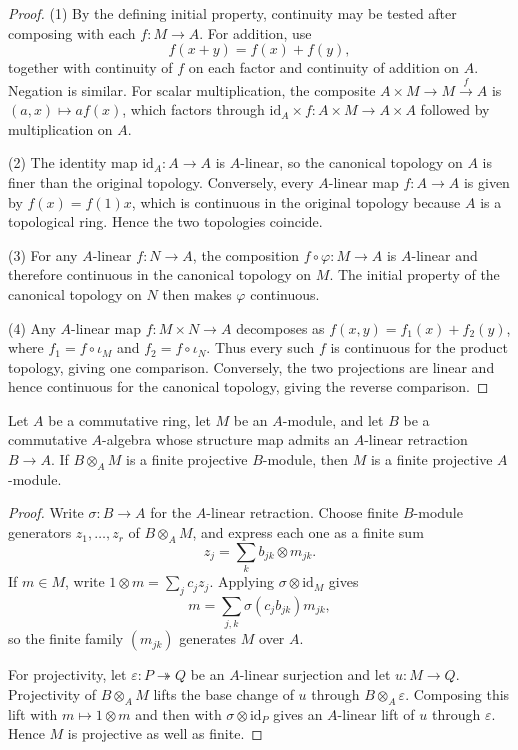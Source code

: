 \begin{proof}
  \leanok
  (1) By the defining initial property, continuity may be tested after
  composing with each $f\colon M\to A$.  For addition, use
  \[
    f(x+y)=f(x)+f(y),
  \]
  together with continuity of $f$ on each factor and continuity of addition
  on $A$.  Negation is similar.  For scalar multiplication, the composite
  $A\times M\to M\xrightarrow{f}A$ is
  $(a,x)\mapsto a f(x)$, which factors through
  $\mathrm{id}_A\times f\colon A\times M\to A\times A$ followed by
  multiplication on $A$.

  (2) The identity map $\mathrm{id}_A\colon A\to A$ is $A$-linear, so the
  canonical topology on $A$ is finer than the original topology.  Conversely,
  every $A$-linear map $f\colon A\to A$ is given by $f(x)=f(1)x$, which is
  continuous in the original topology because $A$ is a topological ring.
  Hence the two topologies coincide.

  (3) For any $A$-linear $f\colon N\to A$, the composition
  $f\circ\varphi\colon M\to A$ is $A$-linear and therefore continuous in the
  canonical topology on $M$.  The initial property of the canonical topology
  on $N$ then makes $\varphi$ continuous.

  (4) Any $A$-linear map $f\colon M\times N\to A$ decomposes as
  $f(x,y)=f_1(x)+f_2(y)$, where $f_1=f\circ\iota_M$ and
  $f_2=f\circ\iota_N$.  Thus every such $f$ is continuous for the product
  topology, giving one comparison.  Conversely, the two projections are
  linear and hence continuous for the canonical topology, giving the reverse
  comparison.
\end{proof}

\begin{lemma}
  \label{lem:split_base_change_descent}
  \leanok
  Let $A$ be a commutative ring, let $M$ be an $A$-module, and let $B$ be a
  commutative $A$-algebra whose structure map admits an $A$-linear retraction
  $B\to A$.  If $B\otimes_A M$ is a finite projective $B$-module, then $M$ is
  a finite projective $A$-module.
\end{lemma}

\begin{proof}
  \leanok
  Write $\sigma\colon B\to A$ for the $A$-linear retraction.  Choose finite
  $B$-module generators $z_1,\ldots,z_r$ of $B\otimes_A M$, and express each
  one as a finite sum
  \[
    z_j=\sum_k b_{jk}\otimes m_{jk}.
  \]
  If $m\in M$, write $1\otimes m=\sum_jc_jz_j$.  Applying
  $\sigma\otimes\mathrm{id}_M$ gives
  \[
    m=\sum_{j,k}\sigma(c_jb_{jk})m_{jk},
  \]
  so the finite family $(m_{jk})$ generates $M$ over $A$.

  For projectivity, let $\varepsilon\colon P\twoheadrightarrow Q$ be an
  $A$-linear surjection and let $u\colon M\to Q$.  Projectivity of
  $B\otimes_A M$ lifts the base change of $u$ through
  $B\otimes_A\varepsilon$.  Composing this lift with
  $m\mapsto1\otimes m$ and then with
  $\sigma\otimes\mathrm{id}_P$ gives an $A$-linear lift of $u$ through
  $\varepsilon$.  Hence $M$ is projective as well as finite.
\end{proof}

